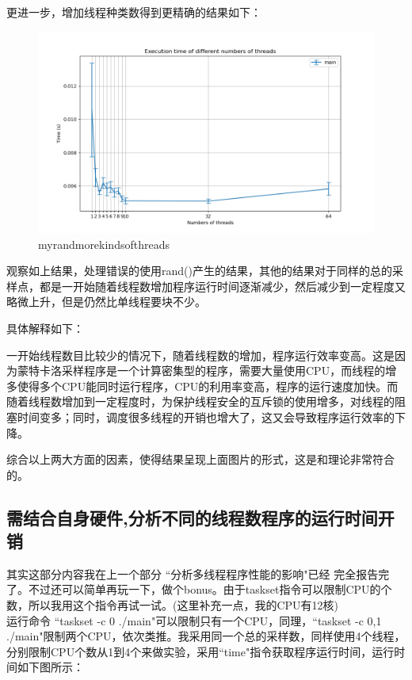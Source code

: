 \documentclass{LabReport}
\begin{document}
	更进一步，增加线程种类数得到更精确的结果如下：
	
\begin{figure}[h!]
	\centering
	\includegraphics[width=0.8\linewidth]{figures/MyRand_MoreKindsOfThreads}
	\caption{myrandmorekindsofthreads}
	\label{fig:myrandmorekindsofthreads}
\end{figure}
	
	观察如上结果，处理错误的使用rand()产生的结果，其他的结果对于同样的总的采样点，都是一开始随着线程数增加程序运行时间逐渐减少，然后减少到一定程度又略微上升，但是仍然比单线程要块不少。\par\hspace{0em}具体解释如下：\par\hspace{0em}
	一开始线程数目比较少的情况下，随着线程数的增加，程序运行效率变高。这是因为蒙特卡洛采样程序是一个计算密集型的程序，需要大量使用CPU，而线程的增多使得多个CPU能同时运行程序，CPU的利用率变高，程序的运行速度加快。而随着线程数增加到一定程度时，为保护线程安全的互斥锁的使用增多，对线程的阻塞时间变多；同时，调度很多线程的开销也增大了，这又会导致程序运行效率的下降。\par\hspace{0em}
	综合以上两大方面的因素，使得结果呈现上面图片的形式，这是和理论非常符合的。
	
	\subsection{需结合自身硬件,分析不同的线程数程序的运行时间开销}
	其实这部分内容我在上一个部分{\color{red} ``分析多线程程序性能的影响"}已经{\color{red} 完全}报告完了。不过还可以简单再玩一下，做个bonus。由于taskset指令可以限制CPU的个数，所以我用这个指令再试一试。(这里补充一点，我的CPU有12核)\\
	
	运行命令 ``taskset -c 0 ./main"可以限制只有一个CPU，同理，``taskset -c 0,1 ./main"限制两个CPU，依次类推。我采用同一个总的采样数，同样使用4个线程，分别限制CPU个数从1到4个来做实验，采用``time"指令获取程序运行时间，运行时间如下图所示：
		
\end{document}
